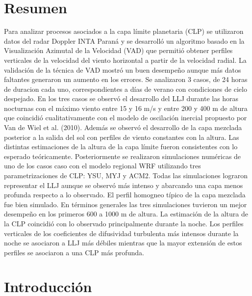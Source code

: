 \documentclass[12pt,spanish,oneside, a4paper]{book}
\begin{document}
\chapter*{Resumen}\begin{center}\begin{minipage}{\dimexpr\paperwidth-7cm}
Para analizar procesos asociados a la capa límite planetaria (CLP) se utilizaron datos del radar Doppler INTA Paraná y se desarrolló un algoritmo basado en la Visualización Azimutal de la Velocidad (VAD) que permitió obtener perfiles verticales de la velocidad del viento horizontal a partir de la velocidad radial. La validación de la técnica de VAD mostró un buen desempeño aunque más datos faltantes generaron un aumento en los errores. Se analizaron 3 casos, de 24 horas de duracion cada uno, correspondientes a días de verano con condiciones de cielo despejado. En los tres casos se observó el desarrollo del LLJ durante las horas nocturnas con el máximo viento entre 15 y 16 m/s y entre 200 y 400 m de altura que coincidió cualitativamente con el modelo de oscilación inercial propuesto por Van de Wiel et al. (2010). Además se observó el desarrollo de la capa mezclada posterior a la salida del sol con perfiles de viento constantes con la altura. Las distintas estimaciones de la altura de la capa límite fueron consistentes con lo esperado teóricamente. Posteriormente se realizaron simulaciones numéricas de uno de los casos caso con el modelo regional WRF utilizando tres parametrizaciones de CLP: YSU, MYJ y ACM2. Todas las simulaciones lograron representar el LLJ aunque se observó más intenso y abarcando una capa menos profunda respecto a lo observado. El perfil homogneo típico de la capa mezclada fue bien simulado. En términos generales las tres simulaciones tuvieron un mejor desempeño en los primeros 600 a 1000 m de altura. La estimación de la altura de la CLP coincidió con lo observado principalmente durante la noche. Los perfiles verticales de los coeficientes de difusividad turbulenta más intensos durante la noche se asociaron a LLJ más débiles mientras que la mayor extensión de estos perfiles se asociaron a una CLP más profunda.
\end{minipage}
\end{center}\newpage

\setcounter{tocdepth}{4} \tableofcontents

\listoffigures
\newpage

\listoftables
\newpage

\chapter{Introducción}\label{introduccion}
\end{document}
